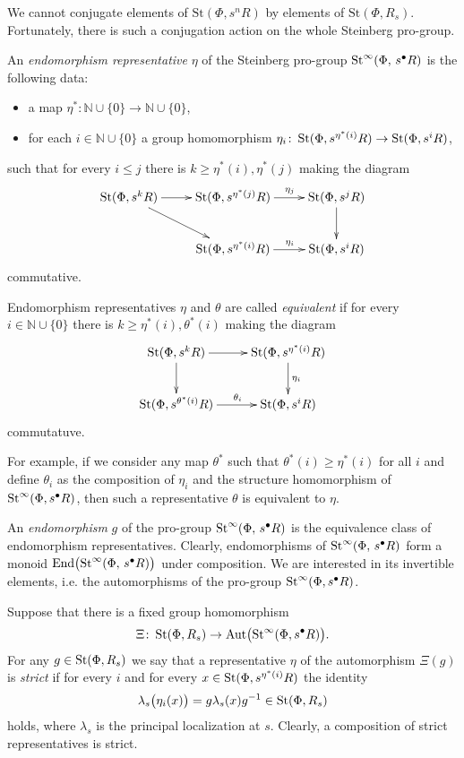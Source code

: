 \documentclass[oneside, 11pt]{amsart} \pdfoutput=1
\begin{document}
We cannot conjugate elements of $\mathrm{St}(\Phi, s^nR)$ by elements of $\mathrm{St}(\Phi, R_s)$. Fortunately, there is such a conjugation action on the whole Steinberg pro-group.

\begin{df}
An {\it endomorphism representative} $\eta$ of the Steinberg pro-group $\mathop{\mathrm{St}}\nolimits^\infty(\Phi,\,s^\bullet R)$ is the following data: 
\begin{itemize}
\item
a map $\eta^* \colon \mathbb N \cup \{0\} \to \mathbb N \cup \{0\}$,
\item
for each $i \in \mathbb N \cup \{0\}$ a group homomorphism $\eta_i \colon \mathop{\mathrm{St}}\nolimits(\Phi, s^{\eta^*(i)} R) \to \mathop{\mathrm{St}}\nolimits(\Phi, s^i R)$,
\end{itemize}
such that for every $i \leq j$ there is $k \geq \eta^*(i), \eta^*(j)$ making the diagram
$$
\xymatrix{
\St(\Phi, s^k R) \ar[r] \ar[rd] & \St(\Phi, s^{\eta^*(j)} R)\ar[r]^(0.55){\eta_j} & \St(\Phi, s^j R) \ar[d]\\
&\St(\Phi, s^{\eta^*(i)} R) \ar[r]^(0.55){\eta_i} & \St(\Phi, s^i R)
}
$$
commutative.

Endomorphism representatives $\eta$ and $\theta$ are called {\it equivalent} if for every $i \in \mathbb N \cup \{0\}$ there is $k \geq \eta^*(i), \theta^*(i)$ making the diagram
$$
\xymatrix{
\St(\Phi, s^k R)\ar[r]\ar[d] & \St(\Phi, s^{\eta^*(i)} R) \ar[d]^{\eta_i}\\
\St(\Phi, s^{\theta^*(i)} R) \ar[r]^(0.55){\theta_i} & \St(\Phi, s^i R)
}
$$
commutatuve.

For example, if we consider any map $\theta^*$ such that $\theta^*(i) \geq \eta^*(i)$ for all $i$ and define $\theta_i$ as the composition of $\eta_i$ and the structure homomorphism of $\mathop{\mathrm{St}}\nolimits^\infty(\Phi, s^\bullet R)$, then such a representative $\theta$ is equivalent to $\eta$.

An {\it endomorphism} $g$ of the pro-group $\mathop{\mathrm{St}}\nolimits^\infty(\Phi,\,s^\bullet R)$ is the equivalence class of endomorphism representatives. Clearly, endomorphisms of $\mathop{\mathrm{St}}\nolimits^\infty(\Phi,\,s^\bullet R)$ form a monoid $\mathrm{End}\bigl(\mathop{\mathrm{St}}\nolimits^\infty(\Phi,\,s^\bullet R)\bigr)$ under composition. We are interested in its invertible elements, i.e. the automorphisms of the pro-group \(\mathop{\mathrm{St}}\nolimits^\infty(\Phi, s^\bullet R)\).

Suppose that there is a fixed group homomorphism $$\Xi \colon \mathop{\mathrm{St}}\nolimits(\Phi, R_s) \to \mathrm{Aut}\bigl(\mathop{\mathrm{St}}\nolimits^\infty(\Phi, s^\bullet R)\bigr).$$ For any $g \in \mathop{\mathrm{St}}\nolimits(\Phi, R_s)$ we say that a representative $\eta$ of the automorphism $\Xi(g)$ is {\it strict} if for every $i$ and for every $x \in \mathop{\mathrm{St}}\nolimits(\Phi, s^{\eta^*(i)} R)$ the identity
$$
\lambda_s\bigl(\eta_i(x)\bigr) = g \lambda_s(x) g^{-1} \in \mathop{\mathrm{St}}\nolimits(\Phi, R_s)
$$
holds, where $\lambda_s$ is the principal localization at $s$. Clearly, a composition of strict representatives is strict.
\end{df}
\end{document}
